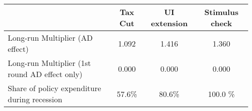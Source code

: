 \begin{tabular}{@{}lccc@{}} 
\toprule 
& Tax Cut    & UI extension    & Stimulus check    \\  \midrule 
Long-run Multiplier (AD effect) &1.092  & 1.416  & 1.360     \\ 
Long-run Multiplier (1st round AD effect only) &0.000  & 0.000  & 0.000     \\ 
Share of policy expenditure during recession &57.6\%  & 80.6\%  & 100.0 \%    \\ 
\end{tabular}  
